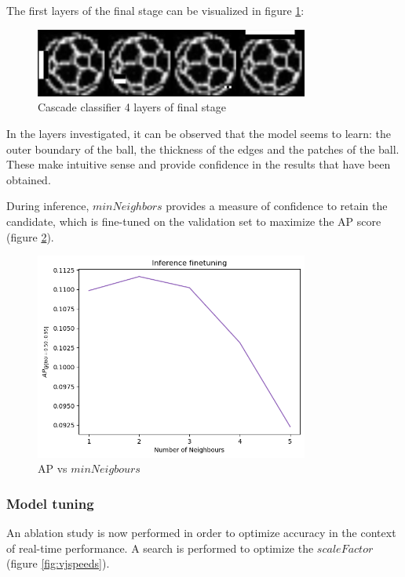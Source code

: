 \documentclass[a4paper,twoside,12pt]{report}
\begin{document}
The first layers of the final stage can be visualized in figure \ref{fig:vjlayers}:

\begin{figure}[h!]
\begin{center}
\includegraphics[width=9cm]{images/vj_result.jpg}
\caption{Cascade classifier 4 layers of final stage}
\label{fig:vjlayers}
\end{center}
\end{figure}

In the layers investigated, it can be observed that the model seems to learn: the outer boundary of the ball, the thickness of the edges and the patches of the ball. These make intuitive sense and provide confidence in the results that have been obtained.

During inference, $minNeighbors$ provides a measure of confidence to retain the candidate, which is fine-tuned on the validation set to maximize the AP score (figure \ref{fig:vjneighbors}).

\begin{figure}[h!]
\begin{center}
\includegraphics[width=9cm]{images/vj_tune.png}
\caption{AP vs $minNeigbours$}
\label{fig:vjneighbors}
\end{center}
\end{figure}

\subsubsection{Model tuning}

An ablation study is now performed in order to optimize accuracy in the context of real-time performance. A search is performed to optimize the $scaleFactor$ (figure \ref{fig:vjspeeds}).
\end{document}
